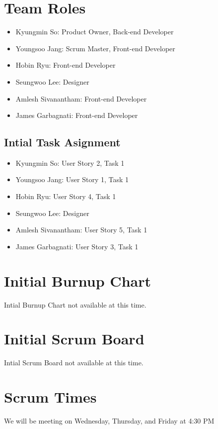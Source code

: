 \documentclass[10pt]{article}
\newcommand{\fancysecX}[2] {{\color{primary}\section*{#1} \label{sec:#2}}}
\newcommand{\fancysubX}[2] {{\color{primary}\subsection*{#1} \label{sec:#2}}}
\begin{document}
\fancysecX{Team Roles}{roles}

    \begin{itemize}
        \item Kyungmin So: Product Owner, Back-end Developer
        \item Youngsoo Jang: Scrum Master, Front-end Developer
        \item Hobin Ryu: Front-end Developer
        \item Seungwoo Lee: Designer
        \item Amlesh Sivanantham: Front-end Developer
        \item James Garbagnati: Front-end Developer
    \end{itemize}

    \fancysubX{Intial Task Asignment}{intialtask}
        \begin{itemize}
            \item Kyungmin So: User Story 2, Task 1
            \item Youngsoo Jang: User Story 1, Task 1
            \item Hobin Ryu: User Story 4, Task 1
            \item Seungwoo Lee: Designer
            \item Amlesh Sivanantham: User Story 5, Task 1 
            \item James Garbagnati: User Story 3, Task 1
        \end{itemize}

\fancysecX{Initial Burnup Chart}{burnupchart}

    Intial Burnup Chart not available at this time.

\fancysecX{Initial Scrum Board}{scrumboard}

   Intial Scrum Board not available at this time.

\fancysecX{Scrum Times}{scrumTimes}

    We will be meeting on Wednesday, Thursday, and Friday at 4:30 PM
\end{document}
